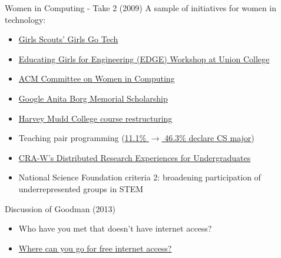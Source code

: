 \documentclass{beamer}
\begin{document}
\begin{frame}{Women in Computing - Take 2 (2009)}
A sample of initiatives for women in technology:
\begin{itemize}
\item \href{http://girlsgotech.org}{Girls Scouts' Girls Go Tech}
\item \href{http://engineering.union.edu/edge/}{Educating Girls for Engineering (EDGE) Workshop at Union College}
\item \href{http://women.acm.org/}{ACM Committee on Women in Computing}
\item \href{http://www.google.com/anitaborg/}{Google Anita Borg Memorial Scholarship}
\item \href{http://dx.doi.org/10.1145/1734263.1734281}{Harvey Mudd College course restructuring}
\item Teaching pair programming (\href{http://cacm.acm.org/magazines/2006/8/5850/fulltext}{11.1\% $\rightarrow$ 46.3\% declare CS major})
\item \href{http://cra-w.org/dreu}{CRA-W's Distributed Research Experiences for Undergraduates}
\item National Science Foundation criteria 2: broadening participation of underrepresented groups in STEM
\end{itemize}
\end{frame}

\begin{frame}{Discussion of Goodman (2013)}
\begin{itemize}
\item Who have you met that doesn't have internet access?
\bigskip
\item \href{http://www.openwifispots.com/FinderDirectoryCity.aspx?City=Birmingham&State=AL}{Where can you go for free internet access?}
\end{itemize}
\end{frame}
\end{document}
